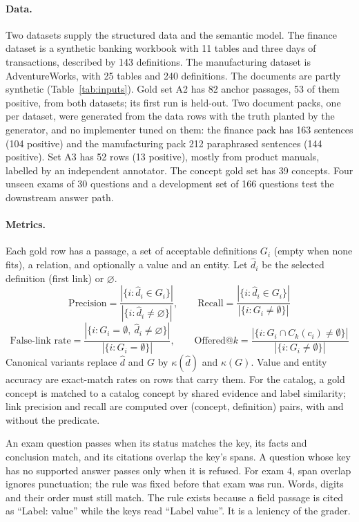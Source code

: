 \documentclass[11pt,a4paper]{article}
\begin{document}
\paragraph{Data.} Two datasets supply the structured data and the semantic model. The finance dataset is a synthetic banking workbook with 11 tables and three days of transactions, described by 143 definitions. The manufacturing dataset is AdventureWorks, with 25 tables and 240 definitions. The documents are partly synthetic (Table~\ref{tab:inputs}). Gold set A2 has 82 anchor passages, 53 of them positive, from both datasets; its first run is held-out. Two document packs, one per dataset, were generated from the data rows with the truth planted by the generator, and no implementer tuned on them: the finance pack has 163 sentences (104 positive) and the manufacturing pack 212 paraphrased sentences (144 positive). Set A3 has 52 rows (13 positive), mostly from product manuals, labelled by an independent annotator. The concept gold set has 39 concepts. Four unseen exams of 30 questions and a development set of 166 questions test the downstream answer path.

\paragraph{Metrics.} Each gold row has a passage, a set of acceptable definitions $G_i$ (empty when none fits), a relation, and optionally a value and an entity. Let $\hat{d}_i$ be the selected definition (first link) or $\varnothing$.
\begin{equation}
\text{Precision} = \frac{|\{i : \hat{d}_i \in G_i\}|}{|\{i : \hat{d}_i \neq \varnothing\}|}, \qquad
\text{Recall} = \frac{|\{i : \hat{d}_i \in G_i\}|}{|\{i : G_i \neq \emptyset\}|}
\end{equation}
\begin{equation}
\text{False-link rate} = \frac{|\{i : G_i = \emptyset,\ \hat{d}_i \neq \varnothing\}|}{|\{i : G_i = \emptyset\}|}, \qquad
\text{Offered@}k = \frac{|\{i : G_i \cap C_k(c_i) \neq \emptyset\}|}{|\{i : G_i \neq \emptyset\}|}
\end{equation}
Canonical variants replace $\hat{d}$ and $G$ by $\kappa(\hat{d})$ and $\kappa(G)$. Value and entity accuracy are exact-match rates on rows that carry them. For the catalog, a gold concept is matched to a catalog concept by shared evidence and label similarity; link precision and recall are computed over (concept, definition) pairs, with and without the predicate.

An exam question passes when its status matches the key, its facts and conclusion match, and its citations overlap the key's spans. A question whose key has no supported answer passes only when it is refused. For exam 4, span overlap ignores punctuation; the rule was fixed before that exam was run. Words, digits and their order must still match. The rule exists because a field passage is cited as ``Label: value'' while the keys read ``Label value''. It is a leniency of the grader. %
\end{document}
